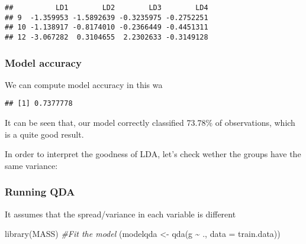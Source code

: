 \documentclass[
]{article}
\newenvironment{Shaded}{\begin{snugshade}}{\end{snugshade}}
\newcommand{\AttributeTok}[1]{\textcolor[rgb]{0.77,0.63,0.00}{#1}}
\newcommand{\CommentTok}[1]{\textcolor[rgb]{0.56,0.35,0.01}{\textit{#1}}}
\newcommand{\DecValTok}[1]{\textcolor[rgb]{0.00,0.00,0.81}{#1}}
\newcommand{\FunctionTok}[1]{\textcolor[rgb]{0.00,0.00,0.00}{#1}}
\newcommand{\NormalTok}[1]{#1}
\newcommand{\OtherTok}[1]{\textcolor[rgb]{0.56,0.35,0.01}{#1}}
\newcommand{\SpecialCharTok}[1]{\textcolor[rgb]{0.00,0.00,0.00}{#1}}
\begin{document}
\begin{Shaded}
\end{Shaded}

\begin{verbatim}
##          LD1        LD2        LD3        LD4
## 9  -1.359953 -1.5892639 -0.3235975 -0.2752251
## 10 -1.138917 -0.8174010 -0.2366449 -0.4451311
## 12 -3.067282  0.3104655  2.2302633 -0.3149128
\end{verbatim}

\hypertarget{model-accuracy}{%
\subsubsection{Model accuracy}\label{model-accuracy}}

We can compute model accuracy in this wa

\begin{Shaded}
\end{Shaded}

\begin{verbatim}
## [1] 0.7377778
\end{verbatim}

It can be seen that, our model correctly classified 73.78\% of
observations, which is a quite good result.

In order to interpret the goodness of LDA, let's check wether the groups
have the same variance:

\hypertarget{running-qda}{%
\subsubsection{Running QDA}\label{running-qda}}

It assumes that the spread/variance in each variable is different

\begin{Shaded}
\begin{Highlighting}[]
\FunctionTok{library}\NormalTok{(MASS)}
\CommentTok{\#Fit the model}
\NormalTok{(modelqda }\OtherTok{\textless{}{-}} \FunctionTok{qda}\NormalTok{(g }\SpecialCharTok{\textasciitilde{}}\NormalTok{ ., }\AttributeTok{data =}\NormalTok{ train.data))}
\end{Highlighting}
\end{Shaded}
\end{document}

